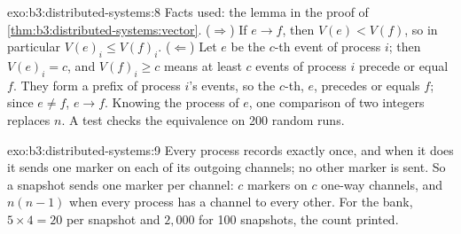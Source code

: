 \begin{solution}{exo:b3:distributed-systems:8}
Facts used: the lemma in the proof of \cref{thm:b3:distributed-systems:vector}. ($\Rightarrow$) If $e \to f$, then $V(e) < V(f)$, so in particular $V(e)_i \le V(f)_i$. ($\Leftarrow$) Let $e$ be the $c$-th event of process $i$; then $V(e)_i = c$, and $V(f)_i \ge c$ means at least $c$ events of process $i$ precede or equal $f$. They form a prefix of process $i$'s events, so the $c$-th, $e$, precedes or equals $f$; since $e \ne f$, $e \to f$. Knowing the process of $e$, one comparison of two integers replaces $n$. A test checks the equivalence on 200 random runs.
\end{solution}

\begin{solution}{exo:b3:distributed-systems:9}
Every process records exactly once, and when it does it sends one marker on each of its outgoing channels; no other marker is sent. So a snapshot sends one marker per channel: $c$ markers on $c$ one-way channels, and $n(n - 1)$ when every process has a channel to every other. For the bank, $5 \times 4 = 20$ per snapshot and $2{,}000$ for 100 snapshots, the count printed.
\end{solution}

